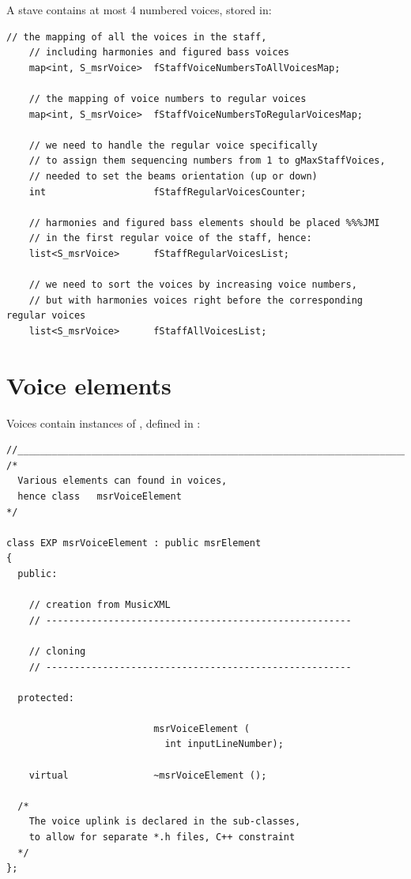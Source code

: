 A stave contains at most 4 numbered voices, stored in:
\begin{lstlisting}[language=CPlusPlus]
    // the mapping of all the voices in the staff,
    // including harmonies and figured bass voices
    map<int, S_msrVoice>  fStaffVoiceNumbersToAllVoicesMap;

    // the mapping of voice numbers to regular voices
    map<int, S_msrVoice>  fStaffVoiceNumbersToRegularVoicesMap;

    // we need to handle the regular voice specifically
    // to assign them sequencing numbers from 1 to gMaxStaffVoices,
    // needed to set the beams orientation (up or down)
    int                   fStaffRegularVoicesCounter;

    // harmonies and figured bass elements should be placed %%%JMI
    // in the first regular voice of the staff, hence:
    list<S_msrVoice>      fStaffRegularVoicesList;

    // we need to sort the voices by increasing voice numbers,
    // but with harmonies voices right before the corresponding regular voices
    list<S_msrVoice>      fStaffAllVoicesList;
\end{lstlisting}


\section{Voice elements}\label{Voice elements}

Voices contain instances of , defined in :
\begin{lstlisting}[language=CPlusPlus]
//______________________________________________________________________________
/*
  Various elements can found in voices,
  hence class   msrVoiceElement
*/

class EXP msrVoiceElement : public msrElement
{
  public:

    // creation from MusicXML
    // ------------------------------------------------------

    // cloning
    // ------------------------------------------------------

  protected:

                          msrVoiceElement (
                            int inputLineNumber);

    virtual               ~msrVoiceElement ();

  /*
    The voice uplink is declared in the sub-classes,
    to allow for separate *.h files, C++ constraint
  */
};
\end{lstlisting}

